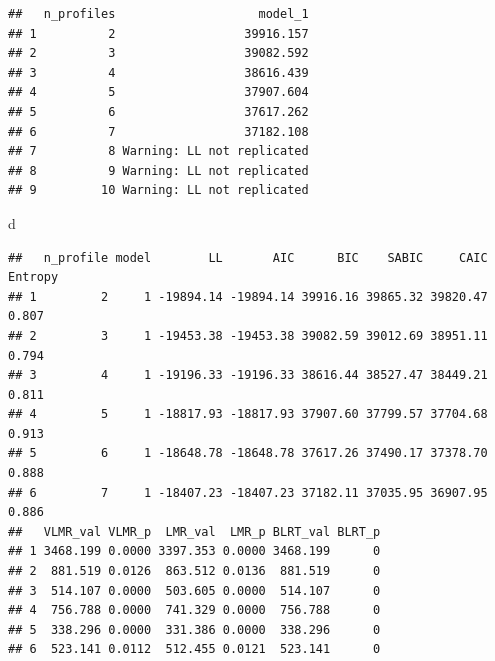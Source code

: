 \documentclass[]{book}
\newenvironment{Shaded}{\begin{snugshade}}{\end{snugshade}}
\newcommand{\KeywordTok}[1]{\textcolor[rgb]{0.13,0.29,0.53}{\textbf{#1}}}
\newcommand{\DataTypeTok}[1]{\textcolor[rgb]{0.13,0.29,0.53}{#1}}
\newcommand{\StringTok}[1]{\textcolor[rgb]{0.31,0.60,0.02}{#1}}
\newcommand{\OperatorTok}[1]{\textcolor[rgb]{0.81,0.36,0.00}{\textbf{#1}}}
\newcommand{\NormalTok}[1]{#1}
\begin{document}
\begin{verbatim}
##   n_profiles                    model_1
## 1          2                  39916.157
## 2          3                  39082.592
## 3          4                  38616.439
## 4          5                  37907.604
## 5          6                  37617.262
## 6          7                  37182.108
## 7          8 Warning: LL not replicated
## 8          9 Warning: LL not replicated
## 9         10 Warning: LL not replicated
\end{verbatim}

\begin{Shaded}
\begin{Highlighting}[]
\NormalTok{d}
\end{Highlighting}
\end{Shaded}

\begin{verbatim}
##   n_profile model        LL       AIC      BIC    SABIC     CAIC Entropy
## 1         2     1 -19894.14 -19894.14 39916.16 39865.32 39820.47   0.807
## 2         3     1 -19453.38 -19453.38 39082.59 39012.69 38951.11   0.794
## 3         4     1 -19196.33 -19196.33 38616.44 38527.47 38449.21   0.811
## 4         5     1 -18817.93 -18817.93 37907.60 37799.57 37704.68   0.913
## 5         6     1 -18648.78 -18648.78 37617.26 37490.17 37378.70   0.888
## 6         7     1 -18407.23 -18407.23 37182.11 37035.95 36907.95   0.886
##   VLMR_val VLMR_p  LMR_val  LMR_p BLRT_val BLRT_p
## 1 3468.199 0.0000 3397.353 0.0000 3468.199      0
## 2  881.519 0.0126  863.512 0.0136  881.519      0
## 3  514.107 0.0000  503.605 0.0000  514.107      0
## 4  756.788 0.0000  741.329 0.0000  756.788      0
## 5  338.296 0.0000  331.386 0.0000  338.296      0
## 6  523.141 0.0112  512.455 0.0121  523.141      0
\end{verbatim}

\begin{Shaded}
\end{Shaded}
\end{document}
